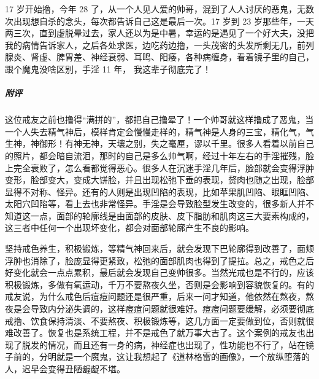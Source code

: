 \begin{case}
    17 岁开始撸，今年 28 了，从一个人见人爱的帅哥，混到了人人讨厌的恶鬼，无数次出现想自杀的念头，每次都告诉自己这是最后一次。17 岁到 23 岁那些年，一天两三次，直到虚脱晕过去，家人还以为是中暑，幸运的是遇见了一个好大夫，没把我的病情告诉家人，之后各处求医，边吃药边撸，一头茂密的头发所剩无几，前列腺炎、肾虚、脾胃差、神经衰弱、耳鸣、阳痿，各种病缠身，看着镜子里的自己，跟个魔鬼没啥区别，手淫 11 年， 我这辈子彻底完了！
    \subparagraph{附评} 这位戒友之前也撸得“满拼的”，都把自己撸晕了！一个帅哥就这样撸成了恶鬼，当一个人失去精气神后，模样肯定会慢慢走样的，精气神是人身的三宝，精化气，气生神，神御形！有神无神，天壤之别，失之毫厘，谬以千里。很多人看着以前自己的照片，都会暗自流泪，那时的自己是多么帅气啊，经过十年左右的手淫摧残，脸上完全衰败了，怎么看都觉得恶心。很多人在沉迷手淫几年后，脸部就会变得浮肿变形，脸部变大，变成大饼脸，并且出现松弛下垂的表现，赘肉也随之出现，脸部显得不对称、怪异。还有的人则是出现凹陷的表现，比如苹果肌凹陷、眼眶凹陷、太阳穴凹陷等，看上去也非常怪异。手淫是会导致脸型发生改变的，很多新人并不知道这一点，面部的轮廓线是由面部的皮肤、皮下脂肪和肌肉这三大要素构成的，这三者中任何一个出现坏变化，都会对面部轮廓产生不良的影响。

    坚持戒色养生，积极锻炼，等精气神回来后，就会发现下巴轮廓得到改善了，面颊浮肿也消除了，脸庞显得更紧致，松弛的面部肌肉也得到了提拉。总之，戒色之后好变化就会一点点累积，最后就会发现自己变帅很多。当然光戒也是不行的，应该积极锻炼，多做有氧运动，千万不要熬夜久坐，否则是会影响到容貌恢复的。有的戒友说，为什么戒色后痘痘问题还是很严重，后来一问才知道，他依然在熬夜，熬夜是会导致内分泌失调的，这样痘痘问题就很难好。痘痘问题要缓解，必须要彻底戒撸、饮食保持清淡、不要熬夜、积极锻炼等，这几方面一定要做到位，否则就很难改善了。恢复也是系统工程，并不是戒色了就万事大吉了。这个案例的戒友也出现了脱发的情况，而且还有一身的病，神经症也出现了，性功能也不行了，站在镜子前的，分明就是一个魔鬼，这让我想起了《道林格雷的画像》，一个放纵堕落的人，迟早会变得丑陋龌龊不堪。
\end{case}

